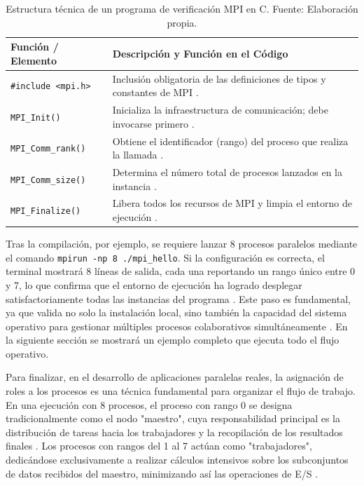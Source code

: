 \begin{table}[H]
    \centering
    \caption{Estructura técnica de un programa de verificación MPI en C. Fuente: Elaboración propia.}
    \label{tab:hello_code}
    \begin{tabular}{|l|p{10cm}|}
    \hline
    \textbf{Función / Elemento} & \textbf{Descripción y Función en el Código} \\ \hline
    \texttt{\#include <mpi.h>} & Inclusión obligatoria de las definiciones de tipos y constantes de MPI \cite{ref9_cristian_Gropp1996, ref11_cristian_OpenMPI_FAQ}. \\ \hline
    \texttt{MPI\_Init()} & Inicializa la infraestructura de comunicación; debe invocarse primero \cite{ref9_cristian_Gropp1996, ref8_cristian_Nielsen2016}. \\ \hline
    \texttt{MPI\_Comm\_rank()} & Obtiene el identificador (rango) del proceso que realiza la llamada \cite{ref9_cristian_Gropp1996}. \\ \hline
    \texttt{MPI\_Comm\_size()} & Determina el número total de procesos lanzados en la instancia \cite{ref9_cristian_Gropp1996}. \\ \hline
    \texttt{MPI\_Finalize()} & Libera todos los recursos de MPI y limpia el entorno de ejecución \cite{ref8_cristian_Nielsen2016, ref11_cristian_OpenMPI_FAQ}. \\ \hline
    \end{tabular}
\end{table}

Tras la compilación, por ejemplo, se requiere lanzar 8 procesos paralelos mediante el comando \texttt{mpirun -np 8 ./mpi\_hello}. Si la configuración es correcta, el terminal mostrará 8 líneas de salida, cada una reportando un rango único entre 0 y 7, lo que confirma que el entorno de ejecución ha logrado desplegar satisfactoriamente todas las instancias del programa \cite{ref9_cristian_Gropp1996, ref11_cristian_OpenMPI_FAQ}. Este paso es fundamental, ya que valida no solo la instalación local, sino también la capacidad del sistema operativo para gestionar múltiples procesos colaborativos simultáneamente \cite{ref4_cristian_Graham2005, ref11_cristian_OpenMPI_FAQ}. En la siguiente sección se mostrará un ejemplo completo que ejecuta todo el flujo operativo.


Para finalizar, en el desarrollo de aplicaciones paralelas reales, la asignación de roles a los procesos es una técnica fundamental para organizar el flujo de trabajo. En una ejecución con 8 procesos, el proceso con rango 0 se designa tradicionalmente como el nodo "maestro", cuya responsabilidad principal es la distribución de tareas hacia los trabajadores y la recopilación de los resultados finales \cite{ref9_cristian_Gropp1996, ref8_cristian_Nielsen2016}. Los procesos con rangos del 1 al 7 actúan como "trabajadores", dedicándose exclusivamente a realizar cálculos intensivos sobre los subconjuntos de datos recibidos del maestro, minimizando así las operaciones de E/S \cite{ref9_cristian_Gropp1996, ref8_cristian_Nielsen2016}.

